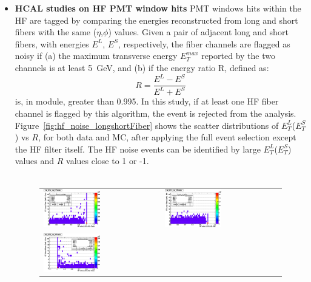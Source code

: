 \begin{itemize}
\item{\bf HCAL studies on HF PMT window hits} PMT windows hits within the HF are tagged by comparing 
the energies reconstructed from long and short fibers with the same ($\eta$,$\phi$) values. 
Given a pair of adjacent long and short 
fibers, with energies $E^L$, $E^S$, respectively, the fiber channels are flagged as noisy if 
(a) the maximum transverse energy $E_T^{max}$ reported by the two channels is at least 5~GeV, and (b) 
if the energy ratio R, defined as:
%
\begin{equation}
R = \frac{E^L - E^S}{E^L + E^S}
\end{equation}
%
is, in module, greater than 0.995. In this study, if at least one HF fiber channel 
is flagged by this algorithm, the event is rejected from the analysis. 
Figure~\ref{fig:hf_noise_longshortFiber} shows the scatter distributions of $E_T^L$($E_T^S$) vs $R$, 
for both data and MC, after applying the full event selection except the HF filter itself.
The HF noise events can be identified by large $E_T^L$($E_T^S$) values and $R$ values close to 1 or -1.
\\
\\
%
\begin{figure}[h!]
 \centering
 \begin{tabular}{ll}
  \includegraphics[width=0.5\textwidth]{plots_hcalnoise/hf_longfiberET_vs_ratio_DATA.eps} &
  \includegraphics[width=0.5\textwidth]{plots_hcalnoise/hf_longfiberET_vs_ratio_MC.eps} \\
  \includegraphics[width=0.5\textwidth]{plots_hcalnoise/hf_shortfiberET_vs_ratio_DATA.eps} &

\end{tabular}
\end{figure}
\end{itemize}
